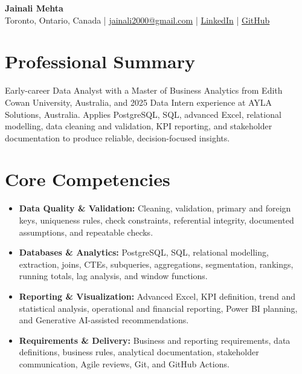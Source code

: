 \documentclass[letterpaper,10pt]{article}
\begin{document}
\begin{center}
  {\fontsize{17}{19}\selectfont\textbf{Jainali Mehta}}\\[2pt]
  \small Toronto, Ontario, Canada \;|\;
  \href{mailto:jainali2000@gmail.com}{jainali2000@gmail.com} \;|\;
  \href{https://www.linkedin.com/in/jainali-mehta}{LinkedIn} \;|\;
  \href{https://github.com/jainalimehta}{GitHub}
\end{center}
\vspace{-7pt}

\section{Professional Summary}
\small Early-career Data Analyst with a Master of Business Analytics from Edith Cowan University, Australia, and 2025 Data Intern experience at AYLA Solutions, Australia. Applies PostgreSQL, SQL, advanced Excel, relational modelling, data cleaning and validation, KPI reporting, and stakeholder documentation to produce reliable, decision-focused insights.

\section{Core Competencies}
\begin{itemize}[leftmargin=0.16in,label=\textbullet,topsep=0pt,itemsep=1pt,parsep=0pt]
  \item \small \textbf{Data Quality \& Validation:} Cleaning, validation, primary and foreign keys, uniqueness rules, check constraints, referential integrity, documented assumptions, and repeatable checks.
  \item \small \textbf{Databases \& Analytics:} PostgreSQL, SQL, relational modelling, extraction, joins, CTEs, subqueries, aggregations, segmentation, rankings, running totals, lag analysis, and window functions.
  \item \small \textbf{Reporting \& Visualization:} Advanced Excel, KPI definition, trend and statistical analysis, operational and financial reporting, Power BI planning, and Generative AI-assisted recommendations.
  \item \small \textbf{Requirements \& Delivery:} Business and reporting requirements, data definitions, business rules, analytical documentation, stakeholder communication, Agile reviews, Git, and GitHub Actions.
\end{itemize}
\end{document}
